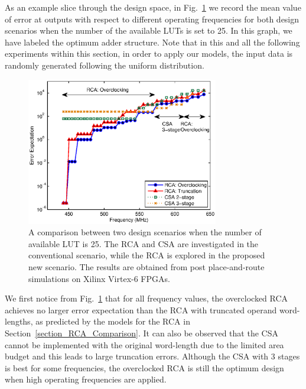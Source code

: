 \documentclass[prodmode,acmtrets]{acmsmall} %
\begin{document}
As an example slice through the design space, in Fig.~\ref{Fig_CSA_LUT25} we record the mean value of error at outputs with respect to different operating frequencies for both design scenarios when the number of the available LUTs is set to 25. In this graph, we have labeled the optimum adder structure. Note that in this and all the following experiments within this section, in order to apply our models, the input data is randomly generated following the uniform distribution.
%
\begin{figure}[t]
  \centering
  \vspace{-3ex}
  \includegraphics[width=3.3in]{./Figures/Error_LUT25_color.eps}
  \vspace{-2ex}
  \caption{A comparison between two design scenarios when the number of available LUT is 25. The RCA and CSA are investigated in the conventional scenario, while the RCA is explored in the proposed new scenario. The results are obtained from post place-and-route simulations on Xilinx Virtex-6 FPGAs.}
  \vspace{-2ex}
  \label{Fig_CSA_LUT25}
\end{figure}

We first notice from Fig.~\ref{Fig_CSA_LUT25} that for all frequency values, the overclocked RCA achieves no larger error expectation than the RCA with truncated operand word-lengths, as predicted by the models for the RCA in Section~\ref{section_RCA_Comparison}. It can also be observed that the CSA cannot be implemented with the original word-length due to the limited area budget and this leads to large truncation errors. Although the CSA with 3 stages is best for some frequencies, the overclocked RCA is still the optimum design when high operating frequencies are applied.
\end{document}
